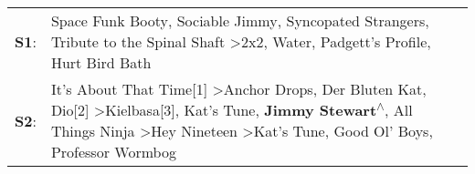 \begin{supertabular}{p{0.03\textwidth}p{0.92\textwidth}}
 \textbf{S1}:  &                                                                                                                                                                                                                    Space Funk Booty\textsuperscript{}, \enspace Sociable Jimmy\textsuperscript{}, \enspace Syncopated Strangers\textsuperscript{}, \enspace Tribute to the Spinal Shaft\textsuperscript{} \textgreater \enspace 2x2\textsuperscript{}, \enspace Water\textsuperscript{}, \enspace Padgett's Profile\textsuperscript{}, \enspace Hurt Bird Bath\textsuperscript{}  \enspace  \\
 \textbf{S2}:  &  It's About That Time[1]\textsuperscript{} \textgreater \enspace Anchor Drops\textsuperscript{}, \enspace Der Bluten Kat\textsuperscript{}, \enspace Dio[2]\textsuperscript{} \textgreater \enspace Kielbasa[3]\textsuperscript{}, \enspace Kat's Tune\textsuperscript{}, \enspace \textbf{Jimmy Stewart\textsuperscript{$\wedge$}}, \enspace All Things Ninja\textsuperscript{} \textgreater \enspace Hey Nineteen\textsuperscript{} \textgreater \enspace Kat's Tune\textsuperscript{}, \enspace Good Ol' Boys\textsuperscript{}, \enspace Professor Wormbog\textsuperscript{}  \enspace  \\
\end{supertabular}
